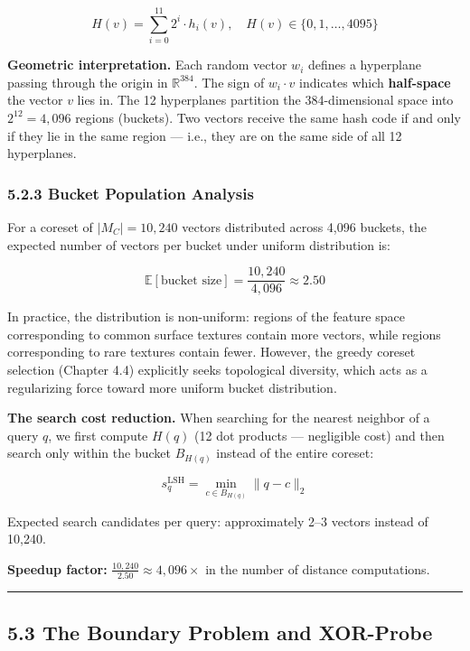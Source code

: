 \[H(v) = \sum_{i=0}^{11} 2^i \cdot h_i(v), \quad H(v) \in \{0, 1, \ldots, 4095\}\]

\textbf{Geometric interpretation.} Each random vector \(w_i\) defines a hyperplane passing through the origin in \(\mathbb{R}^{384}\). The sign of \(w_i \cdot v\) indicates which \textbf{half-space} the vector \(v\) lies in. The 12 hyperplanes partition the 384-dimensional space into \(2^{12} = 4{,}096\) regions (buckets). Two vectors receive the same hash code if and only if they lie in the same region --- i.e., they are on the same side of all 12 hyperplanes.

\subsubsection{5.2.3 Bucket Population Analysis}\label{bucket-population-analysis}

For a coreset of \(|M_C| = 10{,}240\) vectors distributed across 4,096 buckets, the expected number of vectors per bucket under uniform distribution is:

\[\mathbb{E}[\text{bucket size}] = \frac{10{,}240}{4{,}096} \approx 2.50\]

In practice, the distribution is non-uniform: regions of the feature space corresponding to common surface textures contain more vectors, while regions corresponding to rare textures contain fewer. However, the greedy coreset selection (Chapter 4.4) explicitly seeks topological diversity, which acts as a regularizing force toward more uniform bucket distribution.

\textbf{The search cost reduction.} When searching for the nearest neighbor of a query \(q\), we first compute \(H(q)\) (12 dot products --- negligible cost) and then search only within the bucket \(B_{H(q)}\) instead of the entire coreset:

\[s_q^{\text{LSH}} = \min_{c \in B_{H(q)}} \|q - c\|_2\]

Expected search candidates per query: approximately 2--3 vectors instead of 10,240.

\textbf{Speedup factor:} \(\frac{10{,}240}{2.50} \approx 4{,}096\times\) in the number of distance computations.

\begin{center}\rule{0.5\linewidth}{0.5pt}\end{center}

\subsection{5.3 The Boundary Problem and XOR-Probe}\label{the-boundary-problem-and-xor-probe}

